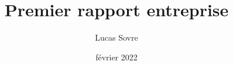\documentclass[a4paper, 12pt]{report}
\title{Premier rapport entreprise}
\author{Lucas Sovre}
\date{février 2022}
\begin{document}
\graphicspath{{/home/e92579/Documents/projects/rapport/1anne/images/}}
\maketitle
\justify
\tableofcontents



\printglossaries





\end{document}
